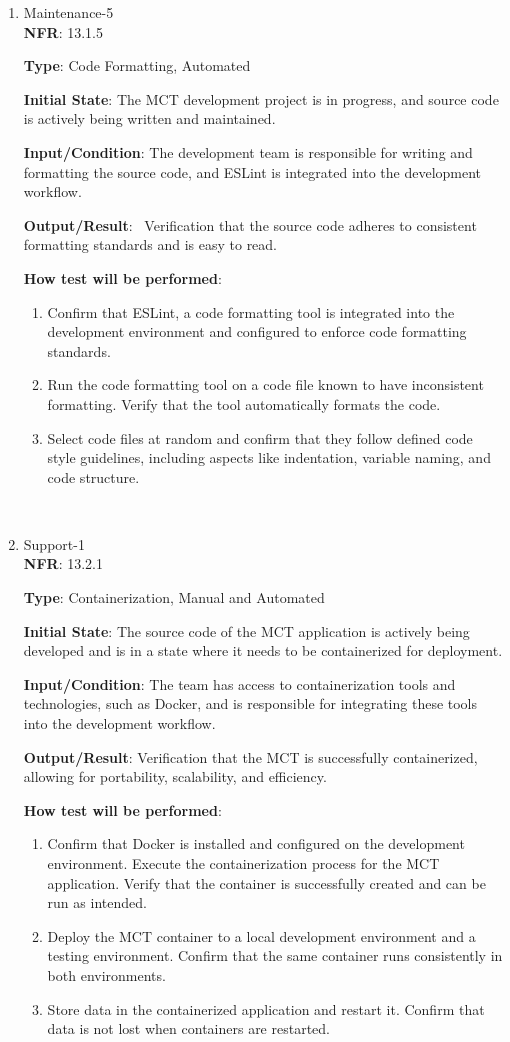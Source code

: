 \documentclass[12pt, titlepage]{article}
\begin{document}
\begin{enumerate}
    \item {Maintenance-5\\}
\textbf{NFR}: 13.1.5

\textbf{Type}: Code Formatting, Automated

\textbf{Initial State}: The MCT development project is in progress, and source code is actively being written and maintained.

\textbf{Input/Condition}: The development team is responsible for writing and formatting the source code, and ESLint is integrated into the development workflow.

\textbf{Output/Result}:  Verification that the source code adheres to consistent formatting standards and is easy to read.

\textbf{How test will be performed}: 
\begin{enumerate}
    \item Confirm that ESLint, a code formatting tool is integrated into the development environment and configured to enforce code formatting standards.
    \item Run the code formatting tool on a code file known to have inconsistent formatting. Verify that the tool automatically formats the code.
    \item Select code files at random and confirm that they follow defined code style guidelines, including aspects like indentation, variable naming, and code structure.
\end{enumerate}\\
 
    \item {Support-1\\}
\textbf{NFR}: 13.2.1

\textbf{Type}: Containerization, Manual and Automated

\textbf{Initial State}: The source code of the MCT application is actively being developed and is in a state where it needs to be containerized for deployment.

\textbf{Input/Condition}: The team has access to containerization tools and technologies, such as Docker, and is responsible for integrating these tools into the development workflow.

\textbf{Output/Result}: Verification that the MCT is successfully containerized, allowing for portability, scalability, and efficiency.

\textbf{How test will be performed}: 
\begin{enumerate}
    \item Confirm that Docker is installed and configured on the development environment. Execute the containerization process for the MCT application. Verify that the container is successfully created and can be run as intended.
    \item Deploy the MCT container to a local development environment and a testing environment. Confirm that the same container runs consistently in both environments.
    \item Store data in the containerized application and restart it. Confirm that data is not lost when containers are restarted.
\end{enumerate}


\end{enumerate}
\end{document}
